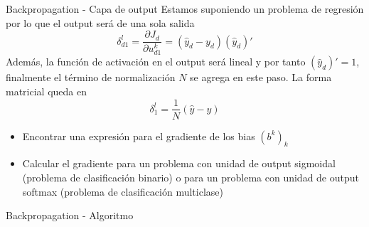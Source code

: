\documentclass[9pt]{beamer}
\begin{document}
\begin{frame}{Backpropagation - Capa de output}
Estamos suponiendo un problema de regresión por lo que el output será de una sola salida
\[
\delta_{d1}^l = \frac{\partial J_d}{\partial u_{d1}^k} = (\hat{y}_d-y_d) (\hat{y}_d)' 
\] 
Además, la función de activación en el output será lineal y por tanto $(\hat{y}_d)' = 1$, finalmente el término de normalización $N$ se agrega en este paso.  La forma matricial queda en 
\[
\delta_{1}^l = \frac{1}{N}(\hat{y}-y)
\]
\begin{propuesto}
\begin{itemize}
  \item Encontrar una expresión para el gradiente de los bias $(b^{k})_k$
  \item Calcular el gradiente para un problema con unidad de output sigmoidal (problema de clasificación binario) o para un problema con unidad de output softmax (problema de clasificación multiclase) 
\end{itemize}
\end{propuesto}


\end{frame}

\begin{frame}{Backpropagation - Algoritmo}


\end{frame}






%
\end{document}
